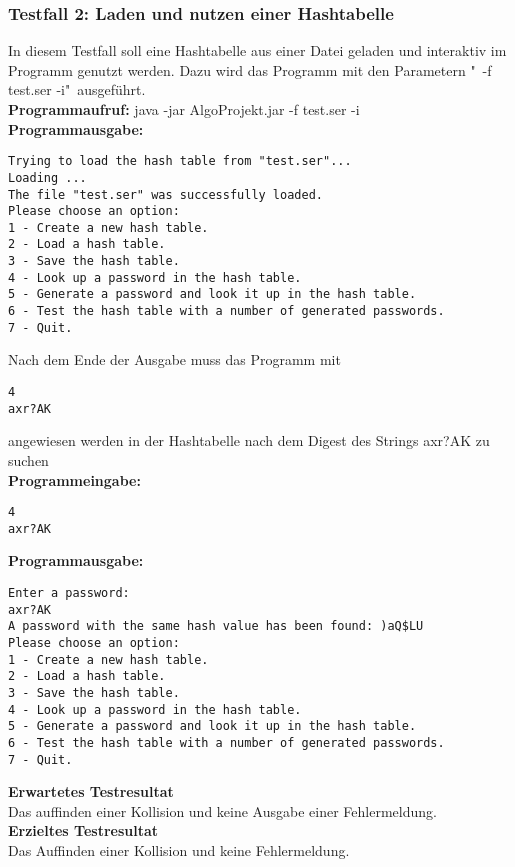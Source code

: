 \documentclass[11pt]{article}
\begin{document}
\subsubsection{Testfall 2: Laden und nutzen einer Hashtabelle}
In diesem Testfall soll eine Hashtabelle aus einer Datei geladen und interaktiv im Programm genutzt werden. Dazu wird das Programm mit den Parametern "\ -f test.ser -i"\ ausgeführt.\\
\textbf{Programmaufruf:} java -jar AlgoProjekt.jar -f test.ser -i \\
\textbf{Programmausgabe:}
\begin{verbatim}
Trying to load the hash table from "test.ser"...
Loading ...
The file "test.ser" was successfully loaded.
Please choose an option:
1 - Create a new hash table.
2 - Load a hash table.
3 - Save the hash table.
4 - Look up a password in the hash table.
5 - Generate a password and look it up in the hash table.
6 - Test the hash table with a number of generated passwords.
7 - Quit.
\end{verbatim}
Nach dem Ende der Ausgabe muss das Programm mit \begin{verbatim}4 
axr?AK 
\end{verbatim} angewiesen werden in der Hashtabelle nach dem Digest des Strings axr?AK zu suchen\\
\textbf{Programmeingabe:}
\begin{verbatim}
4
axr?AK
\end{verbatim}
\textbf{Programmausgabe:}
\begin{verbatim}
Enter a password:
axr?AK
A password with the same hash value has been found: )aQ$LU
Please choose an option:
1 - Create a new hash table.
2 - Load a hash table.
3 - Save the hash table.
4 - Look up a password in the hash table.
5 - Generate a password and look it up in the hash table.
6 - Test the hash table with a number of generated passwords.
7 - Quit.
\end{verbatim}
\textbf{Erwartetes Testresultat}\\
Das auffinden einer Kollision und keine Ausgabe einer Fehlermeldung.\\
\textbf{Erzieltes Testresultat}\\
Das Auffinden einer Kollision und keine Fehlermeldung.
\newpage
\end{document}
